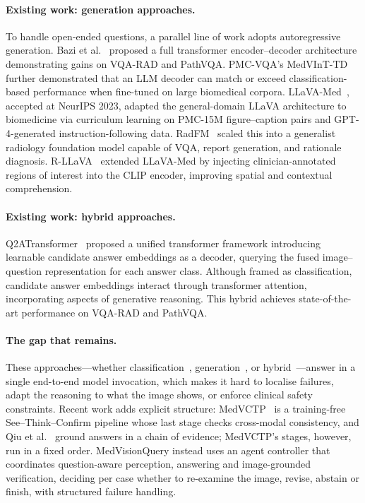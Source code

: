\documentclass{article}
\begin{document}
\paragraph{Existing work: generation approaches.} To handle open-ended questions, a parallel line of work adopts
autoregressive generation. Bazi et al.~\cite{bazi2023} proposed a full transformer encoder--decoder architecture
demonstrating gains on VQA-RAD and PathVQA. PMC-VQA's MedVInT-TD~\cite{zhang2023pmcvqa} further demonstrated that an
LLM decoder can match or exceed classification-based performance when fine-tuned on large biomedical corpora.
LLaVA-Med~\cite{li2023llavamed}, accepted at NeurIPS 2023, adapted the general-domain LLaVA architecture to
biomedicine via curriculum learning on PMC-15M figure--caption pairs and GPT-4-generated instruction-following data.
RadFM~\cite{wu2025radfm} scaled this into a generalist radiology foundation model capable of VQA, report generation,
and rationale diagnosis. R-LLaVA~\cite{chen2025rllava} extended LLaVA-Med by injecting clinician-annotated regions of
interest into the CLIP encoder, improving spatial and contextual comprehension.

\paragraph{Existing work: hybrid approaches.} Q2ATransformer~\cite{liu2023q2a} proposed a unified transformer
framework introducing learnable candidate answer embeddings as a decoder, querying the fused image--question
representation for each answer class. Although framed as classification, candidate answer embeddings interact through
transformer attention, incorporating aspects of generative reasoning. This hybrid achieves state-of-the-art
performance on VQA-RAD and PathVQA.

\paragraph{The gap that remains.} These approaches---whether
classification~\cite{benabacha2019vqamed,nguyen2019mevf,zhang2023pmcvqa}, generation~\cite{bazi2023,li2023llavamed,wu2025radfm,chen2025rllava},
or hybrid~\cite{liu2023q2a}---answer in a single end-to-end model invocation, which makes it hard to localise
failures, adapt the reasoning to what the image shows, or enforce clinical safety constraints. Recent work adds
explicit structure: MedVCTP~\cite{syed2025medvctp} is a training-free See--Think--Confirm pipeline whose last stage
checks cross-modal consistency, and Qiu et al.~\cite{qiu2025chain} ground answers in a chain of evidence; MedVCTP's
stages, however, run in a fixed order. MedVisionQuery instead uses an agent controller that coordinates question-aware perception,
answering and image-grounded verification, deciding per case whether to re-examine the image, revise, abstain or
finish, with structured failure handling.
\end{document}
